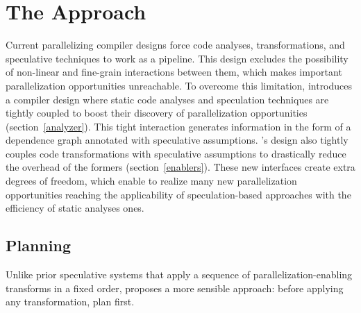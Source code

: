 \section{The \name Approach}
\label{sec:approach}

Current parallelizing compiler designs force code analyses, transformations, and speculative techniques to work as a pipeline.
This design excludes the possibility of non-linear and fine-grain interactions between them, which makes important parallelization opportunities unreachable.
To overcome this limitation, \name introduces a compiler design where static code analyses and speculation techniques are tightly coupled to boost their discovery of parallelization opportunities (section~\ref{analyzer}).
This tight interaction generates information in the form of a dependence graph annotated with speculative assumptions.
\namensp's design also tightly couples code transformations with speculative assumptions to drastically reduce the overhead of the formers (section~\ref{enablers}).
These new interfaces create extra degrees of freedom, which enable \name to realize many new parallelization opportunities reaching the applicability of speculation-based approaches with the efficiency of static analyses ones.


\subsection{Planning}
%
Unlike prior speculative systems that apply a sequence of
parallelization-enabling transforms in a fixed order, \name proposes a
more sensible approach: before applying any transformation, plan
first.

